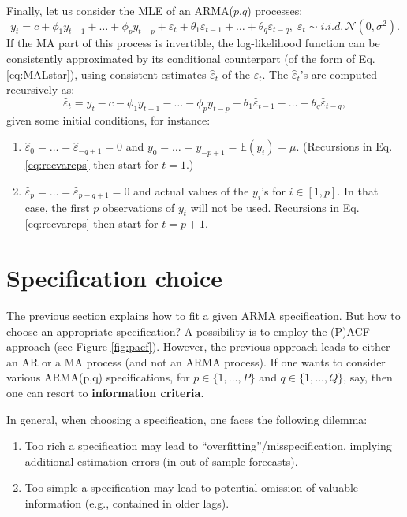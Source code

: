 \documentclass[
  12pt,
]{book}
\providecommand{\tightlist}{%
  \setlength{\itemsep}{0pt}\setlength{\parskip}{0pt}}
\theoremstyle{definition}
\theoremstyle{definition}
\theoremstyle{definition}
\theoremstyle{definition}
\theoremstyle{remark}
\begin{document}
Finally, let us consider the MLE of an ARMA(\(p\),\(q\)) processes:
\[
y_t = c + \phi_1 y_{t-1} + \dots + \phi_p y_{t-p} + \varepsilon_t + \theta_1 \varepsilon_{t-1} +
\dots + \theta_q \varepsilon_{t-q} , \; \varepsilon_t \sim i.i.d.\,\mathcal{N}(0,\sigma^2).
\]
If the MA part of this process is invertible, the log-likelihood function can be consistently approximated by its conditional counterpart (of the form of Eq. \eqref{eq:MALstar}), using consistent estimates \(\hat\varepsilon_t\) of the \(\varepsilon_t\). The \(\hat\varepsilon_t\)'s are computed recursively as:
\begin{equation}
\hat\varepsilon_t = y_t - c - \phi_1 y_{t-1} - \dots - \phi_p y_{t-p} - \theta_1 \hat\varepsilon_{t-1} - \dots - \theta_q \hat\varepsilon_{t-q},\label{eq:recvareps}
\end{equation}
given some initial conditions, for instance:

\begin{enumerate}
\def\labelenumi{\alph{enumi}.}
\tightlist
\item
  \(\hat\varepsilon_0=\dots=\hat\varepsilon_{-q+1}=0\) and \(y_{0}=\dots=y_{-p+1}=\mathbb{E}(y_i)=\mu\). (Recursions in Eq. \eqref{eq:recvareps} then start for \(t=1\).)
\item
  \(\hat\varepsilon_p=\dots=\hat\varepsilon_{p-q+1}=0\) and actual values of the \(y_{i}\)'s for \(i \in [1,p]\). In that case, the first \(p\) observations of \(y_t\) will not be used. Recursions in Eq. \eqref{eq:recvareps} then start for \(t=p+1\).
\end{enumerate}

\hypertarget{specification-choice}{%
\section{Specification choice}\label{specification-choice}}

The previous section explains how to fit a given ARMA specification. But how to choose an appropriate specification? A possibility is to employ the (P)ACF approach (see Figure \ref{fig:pacf}). However, the previous approach leads to either an AR or a MA process (and not an ARMA process). If one wants to consider various ARMA(p,q) specifications, for \(p \in \{1,\dots,P\}\) and \(q \in \{1,\dots,Q\}\), say, then one can resort to \textbf{information criteria}.

In general, when choosing a specification, one faces the following dilemma:

\begin{enumerate}
\def\labelenumi{\alph{enumi}.}
\tightlist
\item
  Too rich a specification may lead to ``overfitting''/misspecification, implying additional estimation errors (in out-of-sample forecasts).
\item
  Too simple a specification may lead to potential omission of valuable information (e.g., contained in older lags).
\end{enumerate}
\end{document}

